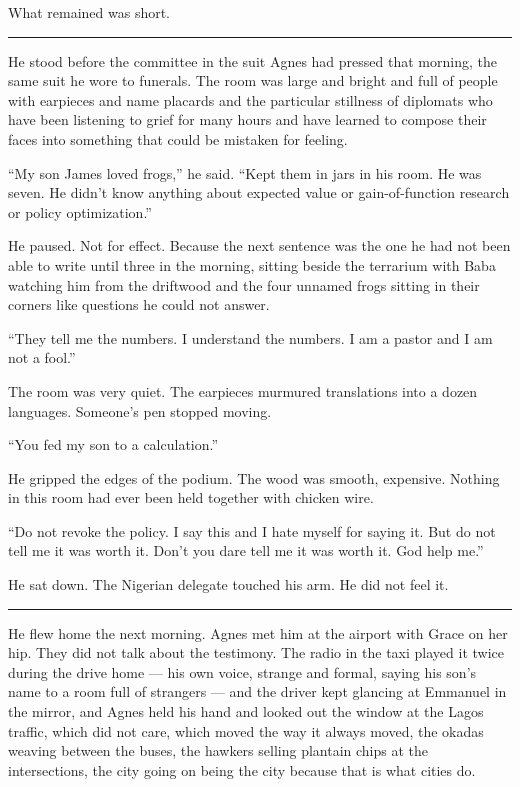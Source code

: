 \documentclass[11pt]{article}
\begin{document}
What remained was short.

\begin{center}\rule{0.3\linewidth}{0.4pt}\end{center}

He stood before the committee in the suit Agnes had pressed that morning, the same suit he wore to funerals. The room was large and bright and full of people with earpieces and name placards and the particular stillness of diplomats who have been listening to grief for many hours and have learned to compose their faces into something that could be mistaken for feeling.

``My son James loved frogs,'' he said. ``Kept them in jars in his room. He was seven. He didn't know anything about expected value or gain-of-function research or policy optimization.''

He paused. Not for effect. Because the next sentence was the one he had not been able to write until three in the morning, sitting beside the terrarium with Baba watching him from the driftwood and the four unnamed frogs sitting in their corners like questions he could not answer.

``They tell me the numbers. I understand the numbers. I am a pastor and I am not a fool.''

The room was very quiet. The earpieces murmured translations into a dozen languages. Someone's pen stopped moving.

``You fed my son to a calculation.''

He gripped the edges of the podium. The wood was smooth, expensive. Nothing in this room had ever been held together with chicken wire.

``Do not revoke the policy. I say this and I hate myself for saying it. But do not tell me it was worth it. Don't you dare tell me it was worth it. God help me.''

He sat down. The Nigerian delegate touched his arm. He did not feel it.

\begin{center}\rule{0.3\linewidth}{0.4pt}\end{center}

He flew home the next morning. Agnes met him at the airport with Grace on her hip. They did not talk about the testimony. The radio in the taxi played it twice during the drive home --- his own voice, strange and formal, saying his son's name to a room full of strangers --- and the driver kept glancing at Emmanuel in the mirror, and Agnes held his hand and looked out the window at the Lagos traffic, which did not care, which moved the way it always moved, the okadas weaving between the buses, the hawkers selling plantain chips at the intersections, the city going on being the city because that is what cities do.
\end{document}
